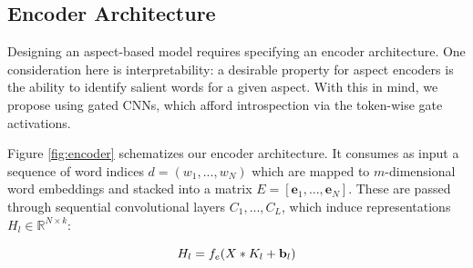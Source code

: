 \documentclass[11pt,a4paper]{article}
\begin{document}





\vspace{-.25em}
\subsection{Encoder Architecture}
\label{section:encoder}
\vspace{-.25em}

Designing an aspect-based model requires specifying an encoder architecture. One consideration here is interpretability: a desirable property for aspect encoders is the ability to identify salient words for a given aspect. With this in mind, we propose using gated CNNs, which afford introspection via the token-wise gate activations. 

Figure \ref{fig:encoder} schematizes our encoder architecture. It consumes as input a sequence of word indices $d = (w_{1}, ..., w_{N})$ which are mapped to $m$-dimensional word embeddings and stacked into a matrix $E = [{\mathbf e}_1, ..., {\mathbf e}_N]$. These are passed through sequential convolutional layers $C_1, ..., C_L$, which induce representations $H_l \in \mathbb{R}^{N \times k}$:

\vspace{-.5em}
\begin{equation}
\vspace{-.2em}
H_l = f_e(X * K_l + {\mathbf b_l})
\end{equation}
\end{document}
